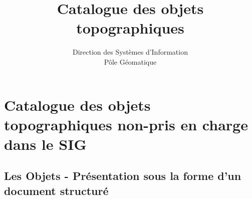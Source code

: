 \documentclass[12pt,titlepage,oneside]{book}
\author{Direction des Systèmes d'Information\\
Pôle Géomatique}
\title{Catalogue des objets topographiques}
\begin{document}
\chapter{Catalogue des objets topographiques non-pris en charge dans le SIG}

\section{Les Objets - Présentation sous la forme d'un document structuré}

\vspace{\baselineskip}

\end{document}
